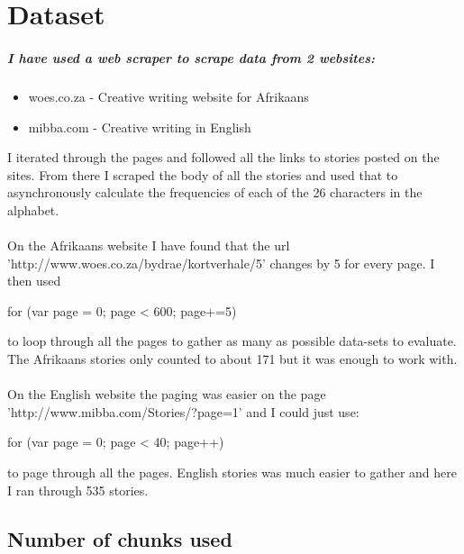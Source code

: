 \documentclass[pdftex,10pt,a4paper]{report}
\begin{document}


\newpage


\newpage
{}

\tableofcontents 

\newpage
{}

\begingroup
\renewcommand{\cleardoublepage}{}
\renewcommand{\clearpage}{}
\chapter{Dataset}
\paragraph{I have used a web scraper to scrape data from 2 websites:}
\begin{itemize}
	\item{woes.co.za - Creative writing website for Afrikaans}
	\item{mibba.com - Creative writing in English}
\end{itemize}
I iterated through the pages and followed all the links to stories posted on the sites. From there I scraped the body of all the stories and used that to asynchronously calculate the frequencies of each of the 26 characters in the alphabet.\\ \\
On the Afrikaans website I have found that the url 'http://www.woes.co.za/bydrae/kortverhale/5' changes by 5 for every page. I then used 
	\begin{center}
		for (var page = 0; page < 600; page+=5) 
	\end{center}
to loop through all the pages to gather as many as possible data-sets to evaluate. The Afrikaans stories only counted to about 171 but it was enough to work with.\\ \\

On the English website the paging was easier on the page 'http://www.mibba.com/Stories/?page=1' and I could just use:
	\begin{center}
		for (var page = 0; page < 40; page++) 
	\end{center}
to page through all the pages. English stories was much easier to gather and here I ran through 535 stories.
\section{Number of chunks used}
\end{document}
